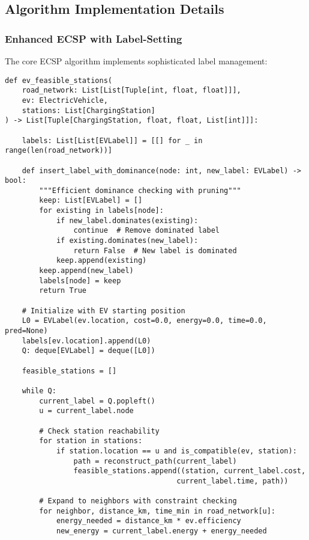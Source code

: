 \documentclass[12pt,a4paper]{article}
\begin{document}
\subsection{Algorithm Implementation Details}

\subsubsection{Enhanced ECSP with Label-Setting}
The core ECSP algorithm implements sophisticated label management:

\begin{lstlisting}[caption=ECSP Label-Setting Algorithm]
def ev_feasible_stations(
    road_network: List[List[Tuple[int, float, float]]],
    ev: ElectricVehicle,
    stations: List[ChargingStation]
) -> List[Tuple[ChargingStation, float, float, List[int]]]:
    
    labels: List[List[EVLabel]] = [[] for _ in range(len(road_network))]
    
    def insert_label_with_dominance(node: int, new_label: EVLabel) -> bool:
        """Efficient dominance checking with pruning"""
        keep: List[EVLabel] = []
        for existing in labels[node]:
            if new_label.dominates(existing):
                continue  # Remove dominated label
            if existing.dominates(new_label):
                return False  # New label is dominated
            keep.append(existing)
        keep.append(new_label)
        labels[node] = keep
        return True
    
    # Initialize with EV starting position
    L0 = EVLabel(ev.location, cost=0.0, energy=0.0, time=0.0, pred=None)
    labels[ev.location].append(L0)
    Q: deque[EVLabel] = deque([L0])
    
    feasible_stations = []
    
    while Q:
        current_label = Q.popleft()
        u = current_label.node
        
        # Check station reachability
        for station in stations:
            if station.location == u and is_compatible(ev, station):
                path = reconstruct_path(current_label)
                feasible_stations.append((station, current_label.cost, 
                                        current_label.time, path))
        
        # Expand to neighbors with constraint checking
        for neighbor, distance_km, time_min in road_network[u]:
            energy_needed = distance_km * ev.efficiency
            new_energy = current_label.energy + energy_needed
            

\end{lstlisting}
\end{document}
